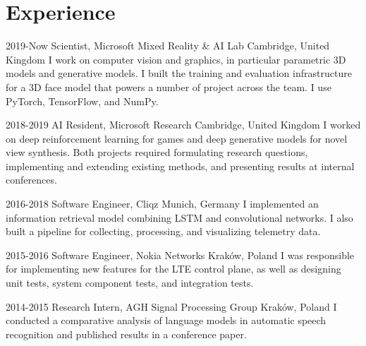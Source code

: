 \documentclass[]{friggeri-cv_osx}
\begin{document}
\vspace{5mm}
\begin{center}
\href{https://sebastiandziadzio.com}{\color{gray} \Large \faHome} \hspace{0.05cm}
\href{https://github.com/sebastiandziadzio}{\color{gray} \Large \faGithub} \hspace{0.05cm}
\href{mailto:sebastian.dziadzio@gmail.com}{\color{gray} \Large\faEnvelope} \hspace{0.05cm}
\href{https://twitter.com/sebadzia}{\color{gray} \Large\faTwitter} \hspace{0.05cm}
\href{https://pl.linkedin.com/in/sebastiandziadzio}{\color{gray} \Large\faLinkedin} \hspace{0.05cm}
\end{center}
\vspace{2mm}

\section{Experience}
\begin{entrylist}
\entry
{2019-Now}
{Scientist, Microsoft Mixed Reality \& AI Lab}
{Cambridge, United Kingdom}
{I work on computer vision and graphics, in particular parametric 3D models and generative models.
I built the training and evaluation infrastructure for a 3D face model that powers a number of project
across the team. I use PyTorch, TensorFlow, and NumPy.\\}

\entry
{2018-2019}
{AI Resident, Microsoft Research}
{Cambridge, United Kingdom}
{I worked on deep reinforcement learning for games and deep generative models for novel view synthesis. Both projects required
formulating research questions, implementing and extending existing methods, and presenting results at internal conferences.\\}

\entry
{2016-2018}
{Software Engineer, Cliqz}
{Munich, Germany}
{I implemented an information retrieval model combining LSTM and convolutional networks. I also built a pipeline for
collecting, processing, and visualizing telemetry data.\\}

\entry
{2015-2016}
{Software Engineer, Nokia Networks}
{Kraków, Poland}
{I was responsible for implementing new features for the LTE control plane, as well as designing unit tests, system component tests,
and integration tests.\\}

\entry
{2014-2015}
{Research Intern, AGH Signal Processing Group}
{Kraków, Poland}
{I conducted a comparative analysis of language models in automatic speech recognition and published results in a conference paper.\\}
\end{entrylist}
\end{document}
